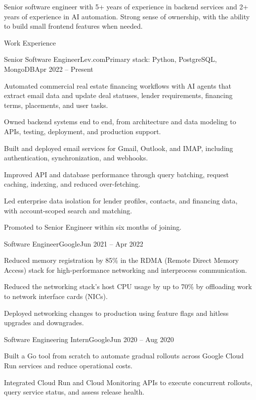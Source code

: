 \documentclass{resume} %
\begin{document}
Senior software engineer with 5+ years of experience in backend services and 2+ years of experience in AI automation. Strong sense of ownership, with the ability to build small frontend features when needed.


\begin{rSection}{Work Experience}
	
\begin{rSubsection}{Senior Software Engineer}{Lev.com}{Primary stack: Python, PostgreSQL, MongoDB}{Apr 2022 -- Present}
	\item Automated commercial real estate financing workflows with AI agents that extract email data and update deal statuses, lender requirements, financing terms, placements, and user tasks.
	\item Owned backend systems end to end, from architecture and data modeling to APIs, testing, deployment, and production support.
	\item Built and deployed email services for Gmail, Outlook, and IMAP, including authentication, synchronization, and webhooks.
	\item Improved API and database performance through query batching, request caching, indexing, and reduced over-fetching.
	\item Led enterprise data isolation for lender profiles, contacts, and financing data, with account-scoped search and matching.
	\item Promoted to Senior Engineer within six months of joining.
\end{rSubsection}
	
\begin{rSubsection}{Software Engineer}{Google}{}{Jun 2021 -- Apr 2022}
	\item Reduced memory registration by 85\% in the RDMA (Remote Direct Memory Access) stack for high-performance networking and interprocess communication.
	\item Reduced the networking stack's host CPU usage by up to 70\% by offloading work to network interface cards (NICs).
	\item Deployed networking changes to production using feature flags and hitless upgrades and downgrades.
\end{rSubsection}

\begin{rSubsection}{Software Engineering Intern}{Google}{}{Jun 2020 -- Aug 2020}
\item Built a Go tool from scratch to automate gradual rollouts across Google Cloud Run services and reduce operational costs.
\item Integrated Cloud Run and Cloud Monitoring APIs to execute concurrent rollouts, query service status, and assess release health.
\end{rSubsection}


\end{rSection}
\end{document}
